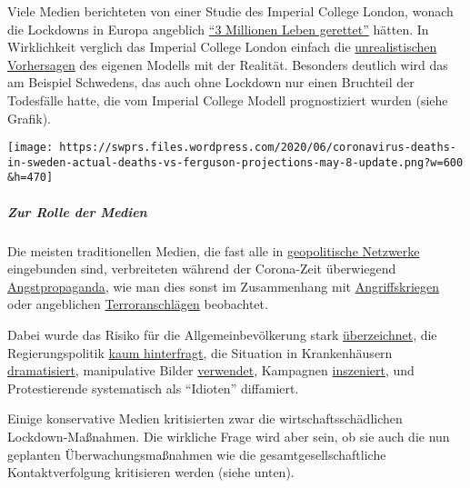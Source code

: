 Viele Medien berichteten von einer Studie des Imperial College London,
wonach die Lockdowns in Europa angeblich
\href{https://www.bbc.com/news/health-52968523}{``3 Millionen Leben
gerettet''} hätten. In Wirklichkeit verglich das Imperial College London
einfach die
\href{https://www.telegraph.co.uk/technology/2020/05/16/neil-fergusons-imperial-model-could-devastating-software-mistake/}{unrealistischen
Vorhersagen} des eigenen Modells mit der Realität. Besonders deutlich
wird das am Beispiel Schwedens, das auch ohne Lockdown nur einen
Bruchteil der Todesfälle hatte, die vom Imperial College Modell
prognostiziert wurden (siehe Grafik).

\texttt{[image: https://swprs.files.wordpress.com/2020/06/coronavirus-deaths-in-sweden-actual-deaths-vs-ferguson-projections-may-8-update.png?w=600\\\&h=470]}

\hypertarget{zur-rolle-der-medien}{%
\subparagraph{\texorpdfstring{\textbf{Zur Rolle der
Medien}}{Zur Rolle der Medien}}\label{zur-rolle-der-medien}}

Die meisten traditionellen Medien, die fast alle in
\href{https://swprs.org/the-american-empire-and-its-media/}{geopolitische
Netzwerke} eingebunden sind, verbreiteten während der Corona-Zeit
überwiegend
\href{https://www.infosperber.ch/Artikel/Gesundheit/13-irrefuhrende-und-falsche-Behauptungen-zur-Corona-Epidemie}{Angstpropaganda},
wie man dies sonst im Zusammenhang mit
\href{https://swprs.org/the-syria-deception/}{Angriffskriegen} oder
angeblichen
\href{https://www.motherjones.com/politics/2013/01/terror-factory-fbi-trevor-aaronson-book/}{Terroranschlägen}
beobachtet.

Dabei wurde das Risiko für die Allgemeinbevölkerung stark
\href{https://www.infosperber.ch/index.cfm?go=Artikel/Gesundheit/13-irrefuhrende-und-falsche-Behauptungen-zur-Corona-Epidemie/\&g=ad}{überzeichnet},
die Regierungspolitik
\href{https://www.zora.uzh.ch/id/eprint/186723/1/jarren_corona.pdf}{kaum
hinterfragt}, die Situation in Krankenhäusern
\href{https://www.globalresearch.ca/truth-behind-refrigerated-morgue-truck-stories/5711475}{dramatisiert},
manipulative Bilder
\href{https://nypost.com/2020/04/01/cbs-admits-to-using-footage-from-italy-in-report-about-nyc/}{verwendet},
Kampagnen
\href{https://www.youtube.com/watch?v=oQWRCECbN-Y}{inszeniert}, und
Protestierende systematisch als ``Idioten'' diffamiert.

Einige konservative Medien kritisierten zwar die wirtschafts­schädlichen
Lockdown-Maßnahmen. Die wirkliche Frage wird aber sein, ob sie auch die
nun geplanten Überwachungs­maßnahmen wie die gesamt­gesell­schaftliche
Kontaktverfolgung kritisieren werden (siehe unten).

